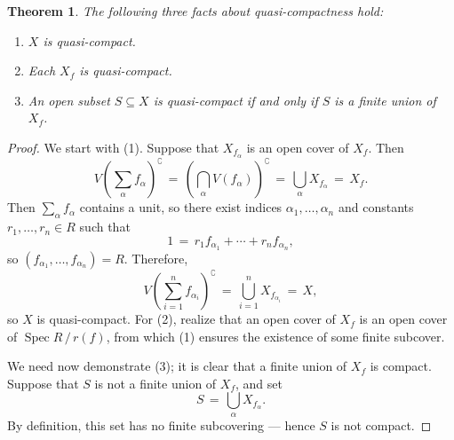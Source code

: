 \documentclass[11pt]{article}
\newtheorem{theorem}{Theorem}
\newcommand{\Spec}{\operatorname{Spec}}
\begin{document}
\begin{adjustwidth}{0.5cm}{}
  \begin{theorem}
    The following three facts about quasi-compactness hold:
    \begin{enumerate}
      \item $X$ is quasi-compact.
      \item Each $X_{f}$ is quasi-compact.
      \item An open subset $S \subseteq X$ is quasi-compact if and only if $S$ is a finite union of $X_{f}$.
    \end{enumerate}
  \end{theorem}
  \begin{proof}
    We start with (1). Suppose that $X_{f_{\alpha}}$ is an open cover of $X_{f}$. Then 
    \[
      V \left( \sum\limits_{\alpha} f_{\alpha}  \right)^{\complement} \, = \, \left( \bigcap\limits_{\alpha} V(f_{\alpha}) \right)^{\complement} \, = \, \bigcup\limits_{\alpha} X_{f_{\alpha}} \, = \, X_{f}.
    \]
    Then $\sum\limits_{\alpha} f_{\alpha}$ contains a unit, so there exist indices $\alpha_{1}, \ldots, \alpha_{n}$ and constants $r_{1}, \ldots, r_{n} \in R$ such that
    \[
      1 \, = \, r_{1} f_{\alpha_{1}} + \cdots + r_{n} f_{\alpha_{n}},
    \]
    so $(f_{\alpha_{1}}, \ldots, f_{\alpha_{n}}) = R$. Therefore,
    \[
      V \left( \sum\limits_{i = 1}^{n} f_{\alpha_{i}} \right)^{\complement} \, = \, \bigcup\limits_{i = 1}^{n} X_{f_{\alpha_{i}}} \, = \, X,
    \]
    so $X$ is quasi-compact. For (2), realize that an open cover of $X_{f}$ is an open cover of $\Spec R \, / \, r(f)$, from which (1) ensures the existence of some finite subcover. 

    We need now demonstrate (3); it is clear that a finite union of $X_{f}$ is compact. Suppose that $S$ is not a finite union of $X_{f}$, and set
    \[
      S \, = \, \bigcup\limits_{\alpha} X_{f_{\alpha}}.
    \]
    By definition, this set has no finite subcovering --- hence $S$ is not compact.
  \end{proof}
\end{adjustwidth}

\end{document}
